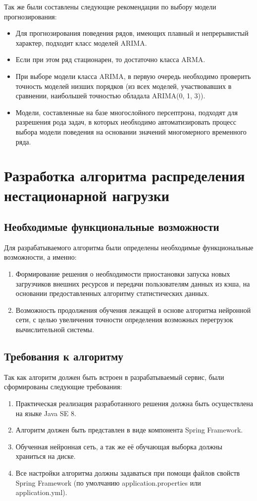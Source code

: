 \documentclass[a4paper,14pt,russian]{extreport}
\begin{document}
Так же были составлены следующие рекомендации по выбору модели 
прогнозирования:
\begin{itemize}
	\item Для прогнозирования поведения рядов, имеющих плавный и 
		непрерывистый характер, подходит класс моделей ARIMA. 
	\item Если при этом ряд стационарен, то достаточно класса ARMA.
	\item При выборе модели класса ARIMA, в первую очередь необходимо 
		проверить точность моделей низших порядков (из всех моделей, 
		участвовавших в сравнении, наибольшей точностью обладала
		 ARIMA(0, 1, 3)).
	\item Модели, составленные на базе многослойного персептрона, подходят 
		для разрешения рода задач, в которых необходимо автоматизировать 
		процесс выбора модели поведения на основании значений 
		многомерного временного ряда.
\end{itemize}

\chapter{Разработка алгоритма распределения нестационарной нагрузки}
\section{Необходимые функциональные возможности}
Для разрабатываемого алгоритма были определены необходимые 
функциональные возможности, а именно: 
\begin{enumerate}
	\item Формирование решения о необходимости приостановки запуска 
		новых загрузчиков внешних ресурсов и передачи пользователям 
		данных из кэша, на основании предоставленных алгоритму 
		статистических данных.
	\item Возможность продолжения обучения лежащей в основе алгоритма 
		нейронной сети, с целью увеличения точности определения 
		возможных перегрузок вычислительной системы.
\end{enumerate}

\section{Требования к алгоритму}
Так как алгоритм должен быть встроен в разрабатываемый сервис, были 
сформированы следующие требования:
\begin{enumerate}
	\item Практическая реализация разработанного решения должна быть 
		осуществлена на языке Java SE 8.
	\item Алгоритм должен быть представлен в виде компонента Spring 
		Framework.
	\item Обученная нейронная сеть, а так же её обучающая выборка должны 
		храниться на диске.
	\item Все настройки алгоритма должны задаваться при помощи файлов 
		свойств Spring Framework (по умолчанию application.properties или 
		application.yml).
\end{enumerate}
\end{document}
